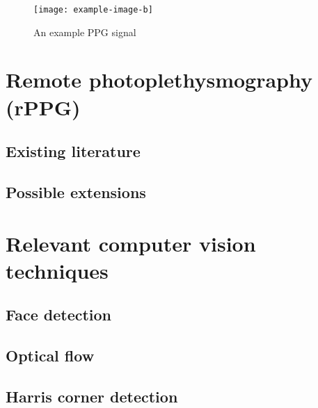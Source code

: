 \begin{figure}[H]

    \texttt{[image: example-image-b]}
   \caption{An example PPG signal} 
\end{figure}

\section{Remote photoplethysmography (rPPG)}

\subsection{Existing literature}

\subsection{Possible extensions}

\section{Relevant computer vision techniques}
\subsection{Face detection}

\subsection{Optical flow}

\subsection{Harris corner detection}

